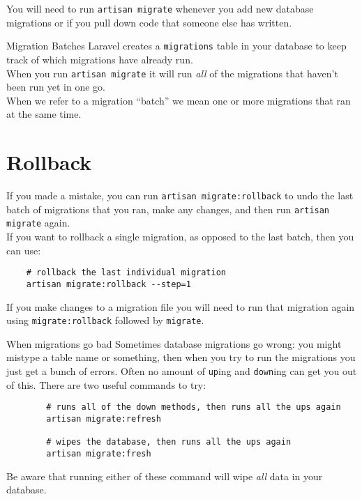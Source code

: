 You will need to run \texttt{artisan migrate} whenever you add new database migrations or if you pull down code that someone else has written.

\begin{infobox}{Migration Batches}
    Laravel creates a \texttt{migrations} table in your database to keep track of which migrations have already run.
    \\

    When you run \texttt{artisan migrate} it will run \textit{all} of the migrations that haven't been run yet in one go.
    \\

    When we refer to a migration ``batch'' we mean one or more migrations that ran at the same time.
\end{infobox}


\section{Rollback}

If you made a mistake, you can run \texttt{artisan migrate:rollback} to undo the last batch of migrations that you ran, make any changes, and then run \texttt{artisan migrate} again.
\\

If you want to rollback a single migration, as opposed to the last batch, then you can use:

\begin{verbatim}
    # rollback the last individual migration
    artisan migrate:rollback --step=1
\end{verbatim}

If you make changes to a migration file you will need to run that migration again using \texttt{migrate:rollback} followed by \texttt{migrate}.


\begin{infobox}{When migrations go bad}
    Sometimes database migrations go wrong: you might mistype a table name or something, then when you try to run the migrations you just get a bunch of errors. Often no amount of \texttt{up}ing and \texttt{down}ing can get you out of this. There are two useful commands to try:

    \begin{verbatim}
        # runs all of the down methods, then runs all the ups again
        artisan migrate:refresh

        # wipes the database, then runs all the ups again
        artisan migrate:fresh
    \end{verbatim}

    Be aware that running either of these command will wipe \textit{all} data in your database.
\end{infobox}



